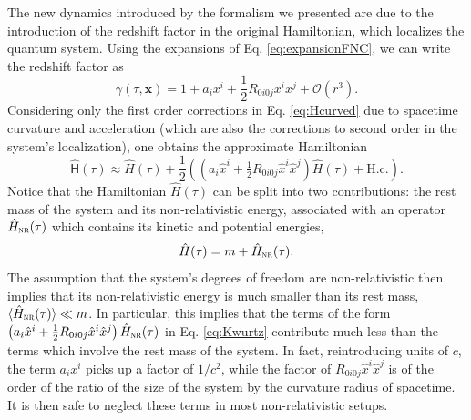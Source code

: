 \documentclass[letterpaper,12pt,titlepage,oneside,final]{book}
\begin{document}
The new dynamics introduced by the formalism we presented are due to the introduction of the redshift factor in the original Hamiltonian, which localizes the quantum system. Using the expansions of Eq. \eqref{eq:expansionFNC}, we can write the redshift factor as
\begin{equation}
    \gamma(\tau,\bm x) = 1 + a_i x^i + \frac{1}{2} R_{0i0j}x^ix^j + \mathcal{O}(r^3).
\end{equation}
Considering only the first order corrections in Eq. \eqref{eq:Hcurved} due to spacetime curvature and acceleration (which are also the corrections to second order in the system's localization), one obtains the approximate Hamiltonian
\begin{equation}\label{eq:Kwurtz}
    \hat{\mathsf{H}}(\tau) \approx \hat{H}(\tau) + \frac{1}{2}\left(\left(a_i \hat{x}^i + \tfrac{1}{2} R_{0i0j}\hat{x}^i\hat{x}^j\right)\hat{H}(\tau) + \text{H.c.}\right).
\end{equation}
Notice that the Hamiltonian $\hat{H}(\tau)$ can be split into two contributions: the rest mass of the system and its non-relativistic energy, associated with an operator $\hat{H}_{\textsc{nr}}(\tau)$ which contains its kinetic and potential energies,
\begin{equation}
    \hat{H}(\tau)  = m +\hat{H}_{\textsc{nr}}(\tau).
\end{equation}
The assumption that the system's degrees of freedom are non-relativistic then implies that its non-relativistic energy is much smaller than its rest mass, $\langle\hat{H}_{\textsc{nr}}(\tau)\rangle\ll m$. In particular, this implies that the terms of the form $\left(a_i \hat{x}^i + \tfrac{1}{2} R_{0i0j}\hat{x}^i\hat{x}^j\right)\hat{H}_{\textsc{nr}}(\tau)$ in Eq. \eqref{eq:Kwurtz} contribute much less than the terms which involve the rest mass of the system. In fact, reintroducing units of $c$, the term $a_i x^i$ picks up a factor of $1/c^2$, while the factor of $R_{0i0j}\hat{x}^i\hat{x}^j$ is of the order of the ratio of the size of the system by the curvature radius of spacetime. It is then safe to neglect these terms in most non-relativistic setups. 
\end{document}
